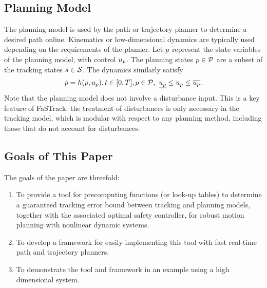 \subsection{Planning Model}
The planning model is used by the path or trajectory planner to determine a desired path online. Kinematics or low-dimensional dynamics are typically used depending on the requirements of the planner. Let $p$ represent the state variables of the planning model, with control $u_p$. The planning states $p \in \mathcal{P}$ are a subset of the tracking states $s \in \mathcal{S}$. The dynamics similarly satisfy 
\begin{equation}
\begin{aligned}
\label{eq:pdyn}
\dot{p} = h(p, u_p), t \in [0, T], p \in \mathcal{P}, \ \underline{u_p} \leq u_p \leq \overline{u_p}.
\end{aligned}
\end{equation}
Note that the planning model does not involve a disturbance input. This is a key feature of FaSTrack: the treatment of disturbances is only necessary in the tracking model, which is modular with respect to any planning method, including those that do not account for disturbances.

\subsection{Goals of This Paper}
The goals of the paper are threefold:
\begin{enumerate}
	\item To provide a tool for precomputing functions (or look-up tables) to determine a guaranteed tracking error bound between tracking and planning models, together with the associated optimal safety controller, for robust motion planning with nonlinear dynamic systems.
	\item To develop a framework for easily implementing this tool with fast real-time path and trajectory planners.
	\item To demonstrate the tool and framework in an example using a high dimensional system.
\end{enumerate}
